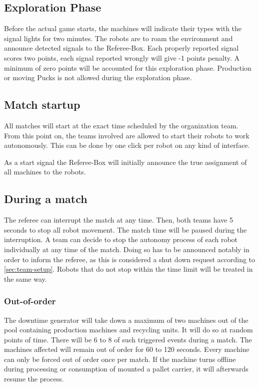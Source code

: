 \documentclass[12pt,twoside]{article}
\begin{document}
\subsection{Exploration Phase}
Before the actual game starts, the machines will indicate their types with the
signal lights for two minutes. The robots are to roam the environment and
announce detected signals to the Referee-Box. Each properly reported signal
scores two points, each signal reported wrongly will give -1 points penalty.
A minimum of zero points will be accounted for this exploration phase.
Production or moving Pucks is not allowed during the exploration phase.

\subsection{Match startup}

All matches will start at the exact time scheduled by the organization
team. From this point on, the teams involved are allowed to start
their robots to work autonomously. This can be done by one click per
robot on any kind of interface. 

As a start signal the Referee-Box will initially announce the true assignment of
all machines to the robots.

\subsection{During a match}

The referee can interrupt the match at any time. Then, both teams have
5 seconds to stop all robot movement. The match time will be paused
during the interruption. A team can decide to stop the autonomy
process of each robot individually at any time of the match. Doing so
has to be announced notably in order to inform the referee, as this is
considered a shut down request according to
\ref{sec:team-setup}. Robots that do not stop within the time limit
will be treated in the same way.

\subsubsection{Out-of-order}

The downtime generator will take down a maximum of two machines out of
the pool containing production machines and recycling units. It will
do so at random points of time. There will be 6 to 8 of such triggered
events during a match. The machines affected will remain out of order
for 60 to 120 seconds. Every machine can only be forced out of order
once per match. If the machine turns offline during processing or
consumption of mounted a pallet carrier, it will afterwards resume the
process.
\end{document}
